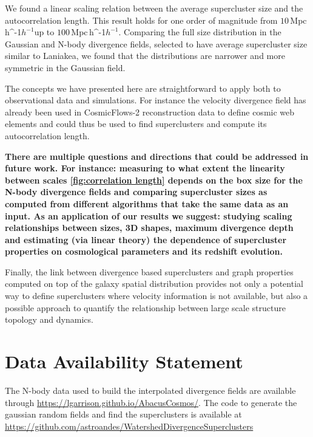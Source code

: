 \documentclass[usenatbib]{mnras}
\newcommand{\Mpch}{\,{\rm Mpc}\,\ifmmode h^{-1}\else $h^{-1}$\fi}
\begin{document}
We found a linear scaling relation between the average supercluster size and the autocorrelation length. 
This result holds for one order of magnitude from $10$\Mpch up to $100$\Mpch.
Comparing the full size distribution in the Gaussian and N-body divergence fields, selected to have average supercluster size similar to Laniakea, we found that the distributions are narrower and more symmetric in the Gaussian field.

The concepts we have presented here are straightforward to apply both to observational data and simulations.
For instance the velocity divergence field has already been used in CosmicFlows-2 reconstruction data to define cosmic web elements \citep{2015MNRAS.452.1052L} and could thus be used to find superclusters and compute its autocorrelation length.

\textbf{
There are multiple questions and directions that could be addressed in future work. 
For instance: measuring to what extent the linearity between scales  \ref{fig:correlation length} depends on the box size for the N-body divergence fields and comparing supercluster sizes as computed from different algorithms that take the same data as an input.
As an application of our results we suggest: studying scaling relationships between sizes, 3D shapes, maximum divergence depth and estimating (via linear theory) the dependence of supercluster properties on cosmological parameters and its redshift evolution.
}

Finally, the link between divergence based superclusters and graph properties \citep{2020A&A...641A.172E, 2020MNRAS.498L.145G} computed on top of the galaxy spatial distribution provides not only a potential way to define superclusters where velocity information is not available, but also a possible approach to quantify the relationship between large scale structure topology and dynamics.


\section*{Data Availability Statement}
The N-body data used to build the interpolated divergence fields are available through \url{https://lgarrison.github.io/AbacusCosmos/}. 
The code to generate the gaussian random fields and find the superclusters is available at \url{https://github.com/astroandes/WatershedDivergenceSuperclusters}



\end{document}
